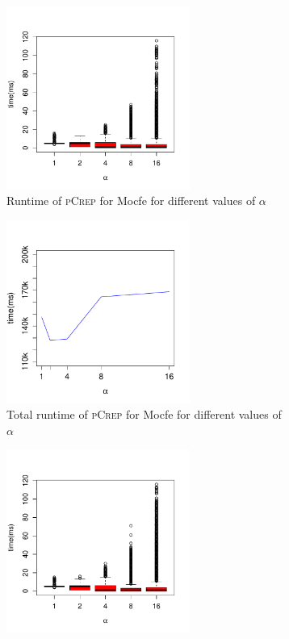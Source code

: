 \documentclass[a4paper,UKenglish,cleveref, autoref, thm-restate,authorcolumns]{../lipics/lipics-v2019}
\newcommand{\adjDel}{\textsc{pCrep}}
\newcommand{\dbmocfe}{Mocfe}
\begin{document}
\label{sec:alpha_influence}
\begin{figure}[ht]
	\begin{minipage}{0.48\linewidth}
		\begin{subfigure}{\linewidth}
			\includegraphics[height=6cm]{boxplot_varying_alphas_mocfe_decompTree}
			\caption{Runtime of \adjDel{} for \dbmocfe{} for different values of $\alpha$}
		\end{subfigure}				
	\end{minipage}
\begin{minipage}{0.48\linewidth}
	\begin{subfigure}{\linewidth}
		\includegraphics*[height=6cm]{plot_varying_alphas_mocfe}
		\caption{Total runtime of \adjDel{} for \dbmocfe{} for different values of $\alpha$}
	\end{subfigure}
\end{minipage}
	\begin{minipage}{0.48\linewidth}
		\begin{subfigure}{\linewidth}
			\includegraphics[height=6cm]{boxplot_varying_alphas_mocfe_coreDel}

\end{subfigure}
\end{minipage}
\end{figure}
\end{document}
